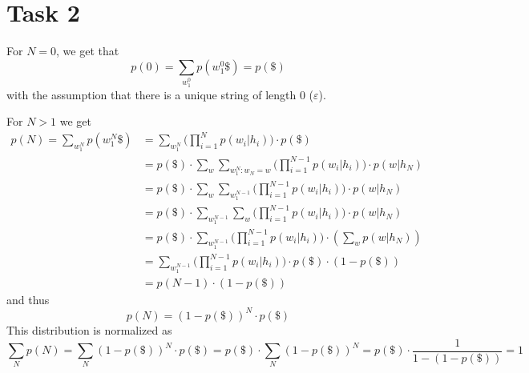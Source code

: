 \documentclass[%
   11pt,              %
   ngerman,           %
   a4paper,           %
   DIV11,             %
]{scrartcl}%
\begin{document}
\section*{Task 2}
For $N = 0$, we get that
\begin{equation*}
	p(0) = \sum_{w_1^0}p(w_1^0\$) = p(\$)
\end{equation*}
with the assumption that there is a unique string of length 0 ($\varepsilon$).\par
For $N > 1$ we get
\begin{align*}
	p(N) = \sum_{w_1^N} p(w_1^N\$) &= \sum_{w_1^N} \bigg(\prod_{i=1}^N p(w_i|h_i)\bigg) \cdot p(\$) \\
	&= p(\$) \cdot \sum_w \sum_{w_1^N\colon w_N = w} \bigg(\prod_{i=1}^{N-1} p(w_i|h_i)\bigg) \cdot p(w|h_N) \\
	&= p(\$) \cdot \sum_w \sum_{w_1^{N-1}} \bigg(\prod_{i=1}^{N-1} p(w_i|h_i)\bigg) \cdot p(w|h_N) \\
	&= p(\$) \cdot \sum_{w_1^{N-1}} \sum_w \bigg(\prod_{i=1}^{N-1} p(w_i|h_i)\bigg) \cdot p(w|h_N) \\
	&= p(\$) \cdot \sum_{w_1^{N-1}} \bigg(\prod_{i=1}^{N-1} p(w_i|h_i)\bigg) \cdot (\sum_w p(w|h_N)) \\
	&= \sum_{w_1^{N-1}} \bigg(\prod_{i=1}^{N-1} p(w_i|h_i)\bigg) \cdot p(\$) \cdot (1 - p(\$)) \\
	&= p(N-1) \cdot (1 - p(\$))
\end{align*}
and thus
\begin{equation*}
	p(N) = (1 - p(\$))^N \cdot p(\$)
\end{equation*}
This distribution is normalized as
\begin{equation*}
	\sum_N p(N) = \sum_N (1 - p(\$))^N \cdot p(\$) = p(\$) \cdot \sum_N (1 - p(\$))^N = p(\$) \cdot \frac{1}{1 - (1 - p(\$))} =1
\end{equation*}
\end{document}
